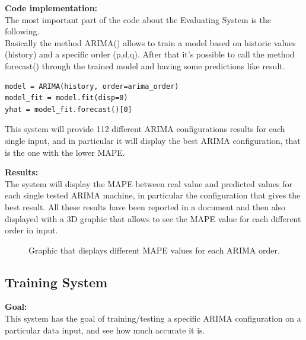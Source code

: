 \textbf{Code implementation:}\\
The most important part of the code about the Evaluating System is the following.\\
Basically the method ARIMA() allows to train a model based on historic values (history) and a specific order (p,d,q). After that it's possible to call the method forecast() through the trained model and having some predictions like result.
\begin{lstlisting}
model = ARIMA(history, order=arima_order)
model_fit = model.fit(disp=0)
yhat = model_fit.forecast()[0]
\end{lstlisting}

This system will provide 112 different ARIMA configurations results for each single input, and in particular it will display the best ARIMA configuration, that is the one with the lower MAPE.

\textbf{Results:}\\
The system will display the MAPE between real value and predicted values for each single tested ARIMA machine, in particular the configuration that gives the best result.
All these results have been reported in a document and then also displayed with a 3D graphic that allows to see the MAPE value for each different order in input.



\begin{figure}[H]
	\raggedleft
    \caption{Graphic that displays different MAPE values for each ARIMA order.}
\end{figure}

 
 
\newpage
\subsection{Training System}
\textbf{Goal:}\\ 
This system has the goal of training/testing a specific ARIMA configuration on a particular data input, and see how much accurate it is. 

